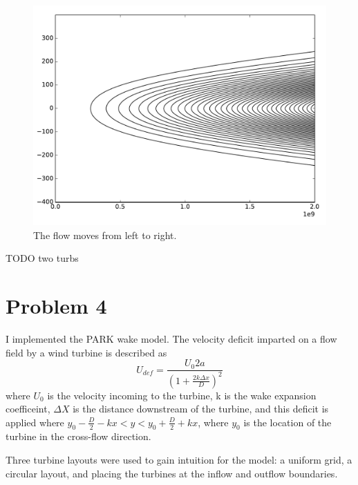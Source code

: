 \documentclass{article}
\begin{document}
\begin{figure}[htb!]
\centering
\includegraphics[scale=.6]{p3streams}
\caption{\label{p3streams}The flow moves from left to right.}
\end{figure}

TODO two turbs

\section{Problem 4}
I implemented the PARK wake model. The velocity deficit imparted on a flow field by a wind turbine is described as
\begin{equation}
U_{def} = \frac{U_0 2a}{( 1 + \frac{ 2 k \Delta x}{D}) ^ 2}
\end{equation}
where $U_0$ is the velocity incoming to the turbine, k is the wake expansion coefficeint, $\Delta X$ is the distance downstream of the turbine, and this deficit is applied where $y_0 - \frac{D}{2} - kx < y <  y_0 + \frac{D}{2} + kx$, where $y_0$ is the location of the turbine in the cross-flow direction.

Three  turbine layouts were used to gain intuition for the model: a uniform grid, a circular layout, and placing the turbines at the inflow and outflow boundaries.
\end{document}
